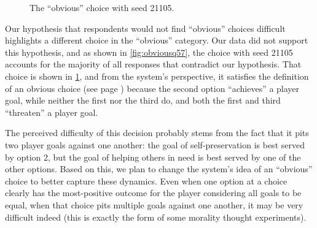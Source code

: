 \begin{figure}[!h]
\centering
{}
  \caption{The ``obvious'' choice with seed 21105.}
  \label{fig:ch21105}
\end{figure}


Our hypothesis that respondents would not find ``obvious'' choices difficult highlights a different choice in the ``obvious'' category.
%
Our data did not support this hypothesis, and as shown in \cref{fig:obviousq57}, the choice with seed 21105 accounts for the majority of all responses that contradict our hypothesis.
%
That choice is shown in \cref{fig:ch21105}, and from the system's perspective, it satisfies the definition of an obvious choice (see page \pageref{page:choicetypes}) because the second option ``achieves'' a player goal, while neither the first nor the third do, and both the first and third ``threaten'' a player goal.


The perceived difficulty of this decision probably stems from the fact that it pits two player goals against one another: the goal of self-preservation is best served by option 2, but the goal of helping others in need is best served by one of the other options.
%
Based on this, we plan to change the system's idea of an ``obvious'' choice to better capture these dynamics.
%
Even when one option at a choice clearly has the most-positive outcome for the player considering all goals to be equal, when that choice pits multiple goals against one another, it may be very difficult indeed (this is exactly the form of some morality thought experiments).


